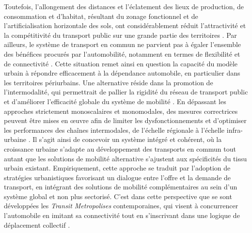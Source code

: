 \begin{refsegment}
Toutefois, l’allongement des distances et l'éclatement des lieux de production, de consommation et d’habitat, résultant du zonage fonctionnel et de l’artificialisation horizontale des sols, ont considérablement réduit l'attractivité et la compétitivité du transport public sur une grande partie des territoires \textcolor{blue}{\autocite[25-28]{mallet_voyage_2022}}. Par ailleurs, le système de transport en commun ne parvient pas à égaler l’ensemble des bénéfices procurés par l’automobilité, notamment en termes de flexibilité et de connectivité \textcolor{blue}{\autocite[209]{heran_retour_2015}}. Cette situation remet ainsi en question la capacité du modèle urbain à répondre efficacement à la dépendance automobile, en particulier dans les territoires périurbains. Une alternative réside dans la promotion de l’intermodalité, qui permettrait de pallier la rigidité du réseau de transport public \textcolor{blue}{\autocite[17]{wiel_comment_1998}} et d’améliorer l’efficacité globale du système de mobilité \textcolor{blue}{\autocite[82]{oostendorp_combining_2018}}. En dépassant les approches strictement monoscalaires et monomodales, des mesures correctrices peuvent être mises en œuvre afin de limiter les dysfonctionnements et d’optimiser les performances des chaînes intermodales, de l’échelle régionale à l’échelle infra-urbaine \textcolor{blue}{\autocite[111-115]{chapelon_transports_2016}}. Il s’agit ainsi de concevoir un système intégré et cohérent, où la croissance urbaine s’adapte au développement des transports en commun tout autant que les solutions de mobilité alternative s’ajustent aux spécificités du tissu urbain existant. Empiriquement, cette approche se traduit par l’adoption de stratégies urbanistiques favorisant un dialogue entre l’offre et la demande de transport, en intégrant des solutions de mobilité complémentaires au sein d’un système global et non plus sectorisé. C’est dans cette perspective que se sont développées les \textsl{Transit Metropolises} contemporaines, qui visent à concurrencer l’automobile en imitant sa connectivité  tout en s’inscrivant dans une logique de déplacement collectif \textcolor{blue}{\autocite[132-133]{cervero_transit_2020}}.%


\end{refsegment}

